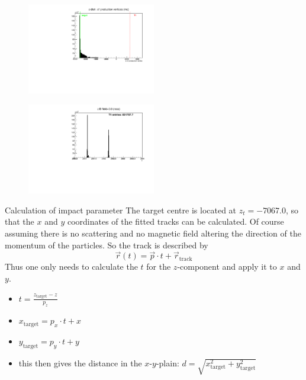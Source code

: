 \begin{frame}[t]{}
  \begin{multicols}{2}
    \begin{figure}
      \centering
      \includegraphics[width=0.5\textwidth]{../hists/nofield/mc_pvtx_z.pdf}
    \end{figure}
    \columnbreak
    \begin{figure}
      \centering
      \includegraphics[width=0.5\textwidth]{../hists/nofield/z_500k.pdf}
    \end{figure}
  \end{multicols}
\end{frame}

\begin{frame}[t]{Calculation of impact parameter}
  The target centre is located at $z_t=-7067.0$, so that the $x$ and $y$ coordinates of the fitted tracks can be calculated. Of course assuming there is no scattering and no magnetic field altering the direction of the momentum of the particles. So the track is described by
  \begin{equation}
    \vec{r}(t)=\vec{p}\cdot t+\vec{r}_\text{track}
  \end{equation}
  Thus one only needs to calculate the $t$ for the $z$-component and apply it to $x$ and $y$.
  \begin{itemize}
    \item $t = \frac{z_\text{target}-z}{p_z}$
    \item $x_\text{target} = p_x\cdot t + x$
    \item $y_\text{target} = p_y\cdot t + y$
    \item this then gives the distance in the $x$-$y$-plain: $d = \sqrt{x_\text{target}^2+y_\text{target}^2}$
  \end{itemize}
\end{frame}

